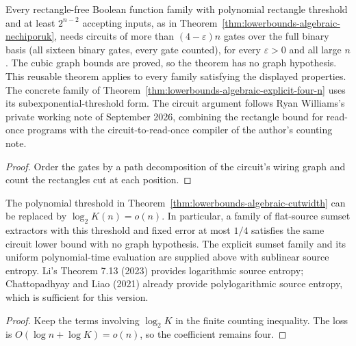 \begin{theorem}
  \label{thm:lowerbounds-algebraic-cutwidth}
  \leanok
  Every rectangle-free Boolean function family with polynomial rectangle
  threshold and at least $2^{n-2}$ accepting inputs, as in
  Theorem~\ref{thm:lowerbounds-algebraic-nechiporuk}, needs circuits of more
  than $(4-\varepsilon)n$ gates over the full binary basis (all sixteen
  binary gates, every gate counted), for every $\varepsilon>0$ and all large
  $n$. The cubic graph bounds are proved, so the theorem has no graph
  hypothesis. This reusable theorem applies to every family satisfying
  the displayed properties. The concrete family of
  Theorem~\ref{thm:lowerbounds-algebraic-explicit-four-n} uses its
  subexponential-threshold form.
  The circuit argument follows Ryan Williams's private working note of
  September 2026, combining the rectangle bound for read-once programs
  with the circuit-to-read-once compiler of the author's counting note.
\end{theorem}
\begin{proof}
  \leanok
  Order the gates by a path decomposition of the circuit's wiring graph and
  count the rectangles cut at each position.
\end{proof}

\begin{theorem}
  \label{thm:lowerbounds-algebraic-cutwidth-subexponential}
  \leanok
  The polynomial threshold in Theorem~\ref{thm:lowerbounds-algebraic-cutwidth}
  can be replaced by $\log_2 K(n)=o(n)$. In particular, a family of flat-source
  sumset extractors with this threshold and fixed error at most $1/4$
  satisfies the same circuit lower bound with no graph hypothesis.
  The explicit sumset family and its uniform polynomial-time evaluation
  are supplied above with sublinear source entropy. Li's Theorem 7.13 (2023) provides
  logarithmic source entropy; Chattopadhyay and Liao (2021) already provide
  polylogarithmic source entropy, which is sufficient for this version.
\end{theorem}
\begin{proof}
  \leanok
  Keep the terms involving $\log_2 K$ in the finite counting inequality.
  The loss is $O(\log n+\log K)=o(n)$, so the coefficient remains four.
\end{proof}

